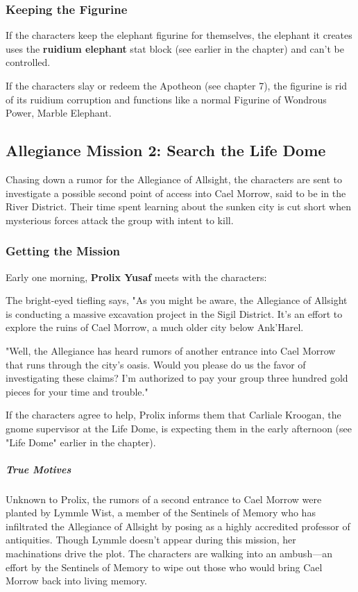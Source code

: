 \documentclass[10pt,a4paper,twoside,bg=print,twocolumn,openany,nodeprecatedcode]{dndbook}
\begin{document}
\subsubsection{Keeping the Figurine}
If the characters keep the elephant figurine for themselves, the elephant it creates uses the \textbf{ruidium elephant} stat block (see earlier in the chapter) and can't be controlled.

If the characters slay or redeem the Apotheon (see chapter 7), the figurine is rid of its ruidium corruption and functions like a normal Figurine of Wondrous Power, Marble Elephant.

\subsection{Allegiance Mission 2: Search the Life Dome}
Chasing down a rumor for the Allegiance of Allsight, the characters are sent to investigate a possible second point of access into Cael Morrow, said to be in the River District. Their time spent learning about the sunken city is cut short when mysterious forces attack the group with intent to kill.

\subsubsection{Getting the Mission}
Early one morning, \textbf{Prolix Yusaf} meets with the characters:

\begin{DndReadAloud}{}
The bright-eyed tiefling says, "As you might be aware, the Allegiance of Allsight is conducting a massive excavation project in the Sigil District. It's an effort to explore the ruins of Cael Morrow, a much older city below Ank'Harel.

"Well, the Allegiance has heard rumors of another entrance into Cael Morrow that runs through the city's oasis. Would you please do us the favor of investigating these claims? I'm authorized to pay your group three hundred gold pieces for your time and trouble."

\end{DndReadAloud}

If the characters agree to help, Prolix informs them that Carliale Kroogan, the gnome supervisor at the Life Dome, is expecting them in the early afternoon (see "Life Dome" earlier in the chapter).

\subparagraph{True Motives}
Unknown to Prolix, the rumors of a second entrance to Cael Morrow were planted by Lymmle Wist, a member of the Sentinels of Memory who has infiltrated the Allegiance of Allsight by posing as a highly accredited professor of antiquities. Though Lymmle doesn't appear during this mission, her machinations drive the plot. The characters are walking into an ambush—an effort by the Sentinels of Memory to wipe out those who would bring Cael Morrow back into living memory.
\end{document}
